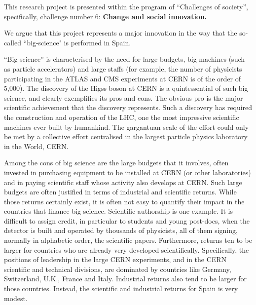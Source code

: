 %
This research project is presented within the program of ``Challenges of society'', specifically, challenge number 6: {\bf Change and social innovation.}

We argue that this project represents a major innovation in the way that the so-called ``big-science" is performed in Spain.

``Big science'' is characterised by the need for large budgets, big machines (such as particle accelerators) and large staffs (for example, the number of physicists participating in the ATLAS and CMS experiments at CERN is of the order of 5,000). The discovery of the Higss boson at CERN is a quintessential of such big science, and clearly exemplifies its pros and cons. The obvious pro is the major scientific achievement that the discovery represents. Such a discovery has required the construction and operation of the LHC, one the most impressive scientific machines ever built by humankind. The gargantuan scale of the effort could only be met by a collective effort centralised in the largest particle physics laboratory in the World, CERN.  

Among the cons of big science are the large budgets that it involves, often invested in purchasing equipment to be installed at CERN (or other laboratories) and in paying scientific staff whose activity also develops at CERN. Such large budgets are often justified in terms of industrial and scientific returns. While those returns certainly exist, it is often not easy to quantify their impact in the countries that finance big science. Scientific authorship is one example. It is difficult to assign credit, in particular to students and young post-docs, when the detector is built and operated by thousands of physicists, all of them signing, normally in alphabetic order, the scientific papers. Furthermore, returns ten to be larger for countries who are already very developed scientifically. Specifically, the positions of leadership in the large CERN experiments, and in the CERN scientific and technical divisions, are dominated by countries like Germany, Switzerland, U.K., France and Italy. Industrial returns also tend to be larger for those countries. Instead, the scientific and industrial returns for Spain is very modest. 

